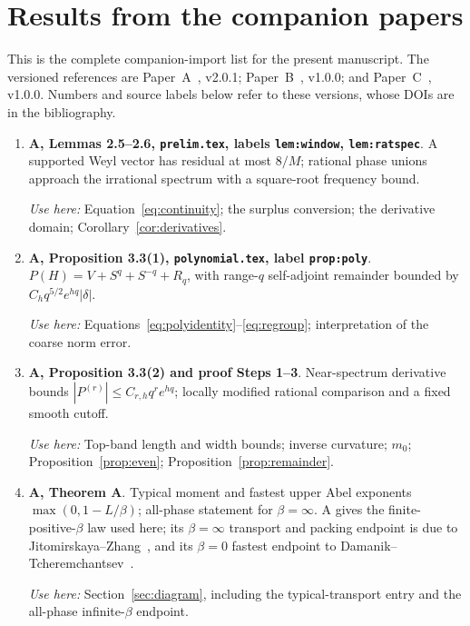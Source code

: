 \section{Results from the companion papers}\label{app:companions}
This is the complete companion-import list for the present manuscript. The versioned references are Paper~A~\cite{PaperA}, v2.0.1; Paper~B~\cite{PaperB}, v1.0.0; and Paper~C~\cite{PaperC}, v1.0.0. Numbers and source labels below refer to these versions, whose DOIs are in the bibliography.

\begin{enumerate}
\item \textbf{A, Lemmas 2.5--2.6, \texttt{prelim.tex}, labels \texttt{lem:window}, \texttt{lem:ratspec}}. A supported Weyl vector has residual at most $8/M$; rational phase unions approach the irrational spectrum with a square-root frequency bound.

\emph{Use here:} Equation~\eqref{eq:continuity}; the surplus conversion; the derivative domain; Corollary~\ref{cor:derivatives}.

\item \textbf{A, Proposition 3.3(1), \texttt{polynomial.tex}, label \texttt{prop:poly}}. $P(H)=V+S^q+S^{-q}+R_q$, with range-$q$ self-adjoint remainder bounded by $C_hq^{5/2}e^{hq}|\delta|$.

\emph{Use here:} Equations~\eqref{eq:polyidentity}--\eqref{eq:regroup}; interpretation of the coarse norm error.

\item \textbf{A, Proposition 3.3(2) and proof Steps 1--3}. Near-spectrum derivative bounds $|P^{(r)}|\le C_{r,h}q^re^{hq}$; locally modified rational comparison and a fixed smooth cutoff.

\emph{Use here:} Top-band length and width bounds; inverse curvature; $m_0$; Proposition~\ref{prop:even}; Proposition~\ref{prop:remainder}.

\item \textbf{A, Theorem A}. Typical moment and fastest upper Abel exponents $\max(0,1-L/\beta)$; all-phase statement for $\beta=\infty$. A gives the finite-positive-$\beta$ law used here; its $\beta=\infty$ transport and packing endpoint is due to Jitomirskaya--Zhang~\cite[Corollary~3]{JZ2022}, and its $\beta=0$ fastest endpoint to Damanik--Tcheremchantsev~\cite{DT2007}.

\emph{Use here:} Section~\ref{sec:diagram}, including the typical-transport entry and the all-phase infinite-$\beta$ endpoint.


\end{enumerate}
